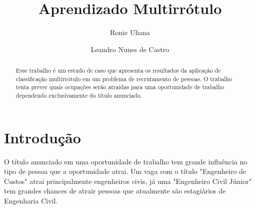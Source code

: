 \documentclass[runningheads,a4paper]{llncs}
\begin{document}


\title{Aprendizado Multirrótulo}

\author{Ronie Uliana}
\author{Leandro Nunes de Castro}

%
\iffalse
\author{Firstname Lastname\inst{1} \and Firstname Lastname\inst{2} }

\institute{
Insitute 1\\
\email{...}\and
Insitute 2\\
\email{...}
}
\fi
			
\maketitle

\begin{abstract}
Esse trabalho é um estudo de caso que apresenta os resultados da aplicação de classificação multirrótulo em um problema de recrutamento de pessoas. O trabalho tenta prever quais ocupações serão atraídas para uma oportunidade de trabalho dependendo exclusivamente do título anunciado.
\end{abstract}


\section{Introdução}\label{sec:intro}

O título anunciado em uma oportunidade de trabalho tem grande influência no tipo de pessoa que a oportunidade atrai. Um vaga com o título "Engenheiro de Custos" atrai principalmente engenheiros civis, já uma "Engenheiro Civil Júnior" tem grandes chances de atrair pessoas que atualmente são estagiários de Engenharia Civil.
\end{document}
